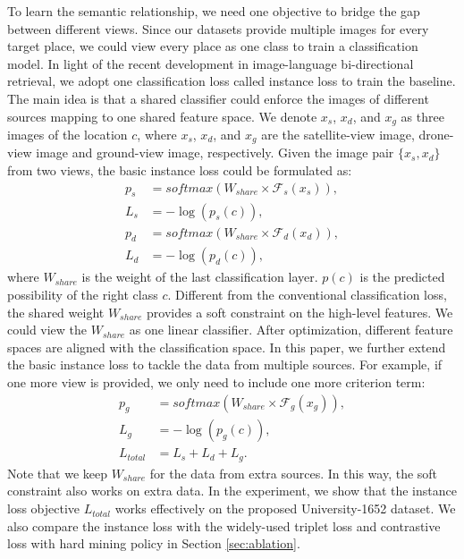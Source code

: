 \documentclass[sigconf]{acmart}
\begin{document}
To learn the semantic relationship, we need one objective to bridge the gap between different views. Since our datasets provide multiple images for every target place, we could view every place as one class to train a classification model. In light of the recent development in image-language bi-directional retrieval, we adopt one classification loss called instance loss \cite{zheng2017dual} to train the baseline. The main idea is that a shared classifier could enforce the images of different sources mapping to one shared feature space. We denote $x_s$, $x_d$, and $x_g$ as three images of the location $c$, where $x_s$, $x_d$, and $x_g$ are the satellite-view image, drone-view image and ground-view image, respectively. Given the image pair $\{x_s, x_d\}$ from two views, the basic instance loss could be formulated as: 
\begin{align}
    p_s &= softmax(W_{share} \times \mathcal{F}_s(x_s)),\\
    L_s &= -\log(p_s(c)), \\
    p_d &= softmax(W_{share} \times \mathcal{F}_d(x_d)),\\
    L_d &= -\log(p_d(c)), 
\end{align}
where $W_{share}$ is the weight of the last classification layer. $p(c)$ is the predicted possibility of the right class $c$. Different from the conventional classification loss, the shared weight $W_{share}$ provides a soft constraint on the high-level features. We could view the $W_{share}$ as one linear classifier. After optimization, different feature spaces are aligned with the classification space.
In this paper, we further extend the basic instance loss to tackle the data from multiple sources. For example, if one more view is provided, we only need to include one more criterion term:
\begin{align}
    p_g &= softmax(W_{share} \times \mathcal{F}_g(x_g)), \\ 
    L_g &= -\log(p_g(c)), \\
    L_{total} &= L_s + L_d + L_g.
\end{align}
Note that we keep $W_{share}$ for the data from extra sources. In this way, the soft constraint also works on extra data. In the experiment, we show that the instance loss objective $L_{total}$ works effectively on the proposed University-1652 dataset. We also compare the instance loss with the widely-used triplet loss \cite{chechik2010large,deng2018triplet} and contrastive loss \cite{lin2015learning,workman2015wide,zheng2016discriminatively} with hard mining policy \cite{hermans2017defense,oh2016deep} in Section \ref{sec:ablation}.
\end{document}
